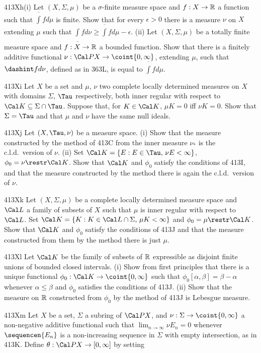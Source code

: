 {\spheader 413Xh(i) Let $(X,\Sigma,\mu)$ be a $\sigma$-finite measure
space and $f:X\to\Bbb R$ a function such that $\overline{\int}fd\mu$ is
finite.   Show that for every $\epsilon>0$ there is a measure $\nu$ on
$X$ extending $\mu$ such that
$\underline{\int}fd\nu\ge\overline{\int}fd\mu-\epsilon$.      (ii) Let $(X,\Sigma,\mu)$ be a totally finite
measure space and $f:X\to\Bbb R$ a bounded function.   Show that there is
a finitely additive functional $\nu:\Cal PX\to\coint{0,\infty}$,
extending $\mu$, such that $\dashint fd\nu$, defined as in 363L, is
equal to $\overline{\int}fd\mu$.

\spheader 413Xi Let $X$ be a set and $\mu$, $\nu$ two complete locally determined measures on $X$ with domains $\Sigma$, $\Tau$ respectively, both inner
regular with respect to $\Cal K\subseteq\Sigma\cap\Tau$.   Suppose that,
for $K\in\Cal K$, $\mu K=0$ iff $\nu K=0$.   Show that $\Sigma=\Tau$ and
that $\mu$ and $\nu$ have the same null ideals.

\sqheader 413Xj Let $(X,\Tau,\nu)$ be a measure space.   (i) Show that
the measure constructed by the method of 413C from the inner measure
$\nu_*$ is the c.l.d.\ version of $\nu$.   (ii) Set
$\Cal K=\{E:E\in\Tau,\,\nu E<\infty\}$, $\phi_0=\nu\restr\Cal K$.   Show
that $\Cal K$ and $\phi_0$ satisfy the conditions of 413I, and that the
measure constructed by the method there is again the c.l.d.\ version of
$\nu$.

\spheader 413Xk Let $(X,\Sigma,\mu)$ be a complete locally determined
measure space and $\Cal L$ a family of subsets of $X$ such that $\mu$ is
inner regular with respect to $\Cal L$.   Set
$\Cal K=\{K:K\in\Cal L\cap\Sigma,\,\mu K<\infty\}$ and
$\phi_0=\mu\restr\Cal K$.   Show that
$\Cal K$ and $\phi_0$ satisfy the conditions of 413J and that the measure
constructed from them by the method there is just $\mu$.

\sqheader 413Xl Let $\Cal K$ be the family of subsets of $\Bbb R$
expressible as disjoint finite unions of bounded closed intervals.
(i) Show from first principles that there is a unique functional
$\phi_0:\Cal K\to\coint{0,\infty}$ such that
$\phi_0[\alpha,\beta]=\beta-\alpha$
whenever $\alpha\le\beta$ and $\phi_0$ satisfies the conditions of 413J.
(ii) Show that the measure on $\Bbb R$ constructed from $\phi_0$ by the
method of 413J is Lebesgue measure.

\spheader 413Xm Let $X$ be a set, $\Sigma$ a subring of $\Cal PX$, and
$\nu:\Sigma\to\coint{0,\infty}$ a non-negative additive functional such
that $\lim_{n\to\infty}\nu E_n=0$ whenever $\sequencen{E_n}$ is a
non-increasing sequence in $\Sigma$ with empty intersection, as in 413K.
Define $\theta:\Cal PX\to[0,\infty]$ by setting

}

